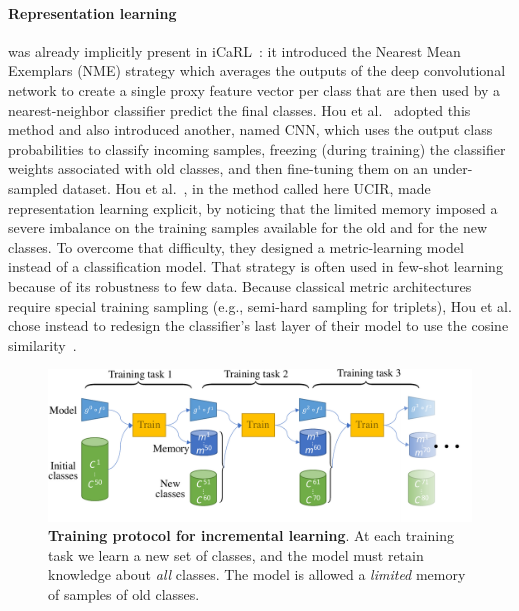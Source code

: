 \paragraph{Representation learning} was already implicitly present in
iCaRL~\citep{rebuffi2017icarl}: it introduced the Nearest Mean Exemplars (NME) strategy which
averages the outputs of the deep convolutional network to create a single proxy feature vector per
class that are then used by a nearest-neighbor classifier predict the final classes. Hou et
al.~\citep{hou2019ucir} adopted this method and also introduced another, named CNN, which uses the
output class probabilities to classify incoming samples, freezing (during training) the classifier
weights associated with old classes, and then fine-tuning them on an under-sampled dataset. Hou et
al.~\citep{hou2019ucir}, in the method called here UCIR, made representation learning explicit, by
noticing that the limited memory imposed a severe imbalance on the training samples available for
the old and for the new classes. To overcome that difficulty, they designed a metric-learning model
instead of a classification model. That strategy is often used in few-shot
learning~\citep{gidaris2018fewshot_wo_forgetting} because of its robustness to few data. Because
classical metric architectures require special training sampling (e.g., semi-hard sampling for
triplets), Hou et al. chose instead to redesign the classifier's last layer of their model to use
the cosine similarity~\citep{luo2018cosine_classifier}.


\begin{figure}[tb]
    \begin{center}
        \includegraphics[width=1.0\linewidth]{images/podnet/protocol}
    \end{center}
    \caption{\textbf{Training protocol for incremental learning}. At each training task we learn a
        new set of classes, and the model must retain knowledge about \textit{all} classes. The
        model is allowed a \textit{limited} memory of samples of old classes.}
    \label{fig:podnet_protocol}
\end{figure}

